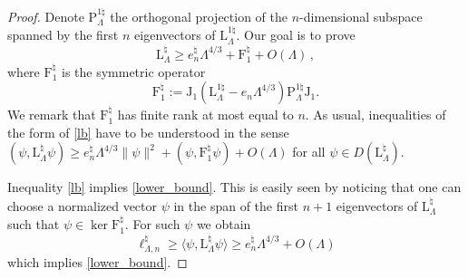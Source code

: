 \documentclass[a4paper,11pt,reqno]{amsart}
\theoremstyle{definition}
\numberwithin{equation}{section}
\newcommand{\Lrm}{\mathrm{L}}
\newcommand{\bosfer}{{\natural}}
\begin{document}
    \begin{proof}
     Denote     $\mathrm{P}^{1\bosfer}_{\Lambda}$  the orthogonal projection of the $n$-dimensional subspace spanned by the first $n$ eigenvectors of $\Lrm^{1\bosfer}_\Lambda$.
Our goal is to prove
    \begin{equation} \label{lb}
        \Lrm_\Lambda^\bosfer \geq e^{\bosfer}_{n} \Lambda^{4/3}  + {\mathrm{F}^\bosfer_1} + O(\Lambda) \, ,
    \end{equation}
where ${\mathrm{F}^\bosfer_1}$ is the  symmetric operator
\begin{equation*}%
   {\mathrm{F}^\bosfer_1} := \mathrm{J_1}(\Lrm^{1\bosfer}_{\Lambda}- e_n\Lambda^{4/3})\mathrm{P}^{1\bosfer}_{\Lambda}\mathrm{J_1}  .
\end{equation*}
We remark that $  {\mathrm{F}^\bosfer_1}$ has finite rank at most equal to $n$. As usual, inequalities of the form of  \eqref{lb} have to be understood in the sense $(\psi,\Lrm_\Lambda^\bosfer\psi) \geq e^\bosfer_{n} \Lambda^{4/3}\|\psi\|^2  + (\psi,{\mathrm{F_{1}^{\bosfer}}}\psi)  + O(\Lambda)$ for all $\psi\in D(\Lrm_\Lambda^\bosfer)$.

Inequality \eqref{lb} implies \eqref{lower_bound}. This is easily seen by noticing that one can choose a normalized vector $\psi$ in the span of the first $n+1$ eigenvectors of $\Lrm_\Lambda^\bosfer$ such that $\psi \in \ker {\mathrm{F}^\bosfer_1}$. For such $\psi$ we obtain 
\[
\ell^{\bosfer}_{\Lambda, n} \geq \langle\psi, \Lrm_\Lambda^\bosfer \psi\rangle \geq e^\bosfer_{n}  \Lambda^{4/3} + O(\Lambda)
\]
which implies \eqref{lower_bound}.


\end{proof}
\end{document}

